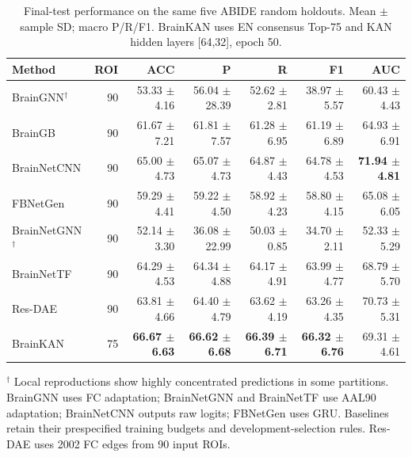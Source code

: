 \begin{table}[t]
\centering\fontsize{9}{11}\selectfont\setlength{\tabcolsep}{3pt}
\caption{Final-test performance on the same five ABIDE random holdouts. Mean $\pm$ sample SD; macro P/R/F1. BrainKAN uses EN consensus Top-75 and KAN hidden layers [64,32], epoch 50.}
\begin{tabular}{lrrrrrr}
\toprule
Method & ROI & ACC & P & R & F1 & AUC \\
\midrule
BrainGNN$^\dagger$ & 90 & 53.33 $\pm$ 4.16 & 56.04 $\pm$ 28.39 & 52.62 $\pm$ 2.81 & 38.97 $\pm$ 5.57 & 60.43 $\pm$ 4.43 \\
BrainGB & 90 & 61.67 $\pm$ 7.21 & 61.81 $\pm$ 7.57 & 61.28 $\pm$ 6.95 & 61.19 $\pm$ 6.89 & 64.93 $\pm$ 6.91 \\
BrainNetCNN & 90 & 65.00 $\pm$ 4.73 & 65.07 $\pm$ 4.73 & 64.87 $\pm$ 4.43 & 64.78 $\pm$ 4.53 & \textbf{71.94 $\pm$ 4.81} \\
FBNetGen & 90 & 59.29 $\pm$ 4.41 & 59.22 $\pm$ 4.50 & 58.92 $\pm$ 4.23 & 58.80 $\pm$ 4.15 & 65.08 $\pm$ 6.05 \\
BrainNetGNN$^\dagger$ & 90 & 52.14 $\pm$ 3.30 & 36.08 $\pm$ 22.99 & 50.03 $\pm$ 0.85 & 34.70 $\pm$ 2.11 & 52.33 $\pm$ 5.29 \\
BrainNetTF & 90 & 64.29 $\pm$ 4.53 & 64.34 $\pm$ 4.88 & 64.17 $\pm$ 4.91 & 63.99 $\pm$ 4.77 & 68.79 $\pm$ 5.70 \\
Res-DAE & 90 & 63.81 $\pm$ 4.66 & 64.40 $\pm$ 4.79 & 63.62 $\pm$ 4.19 & 63.26 $\pm$ 4.35 & 70.73 $\pm$ 5.31 \\
BrainKAN & 75 & \textbf{66.67 $\pm$ 6.63} & \textbf{66.62 $\pm$ 6.68} & \textbf{66.39 $\pm$ 6.71} & \textbf{66.32 $\pm$ 6.76} & 69.31 $\pm$ 4.61 \\
\bottomrule
\end{tabular}
\par\smallskip\parbox{\textwidth}{\fontsize{9}{11}\selectfont $^\dagger$ Local reproductions show highly concentrated predictions in some partitions. BrainGNN uses FC adaptation; BrainNetGNN and BrainNetTF use AAL90 adaptation; BrainNetCNN outputs raw logits; FBNetGen uses GRU. Baselines retain their prespecified training budgets and development-selection rules. Res-DAE uses 2002 FC edges from 90 input ROIs.}
\end{table}
